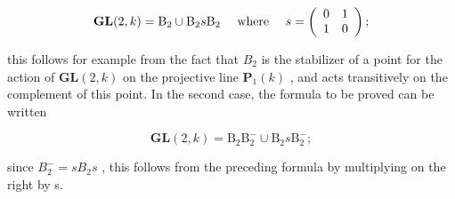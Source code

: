 \[
\mathbf {G L} (2, k) = \mathrm{B} _ {2} \cup \mathrm{B} _ {2} s \mathrm{B} _ {2} \quad \text { where } \quad s = \left( \begin{array}{c c} 0 & 1 \\ 1 & 0 \end{array} \right);
\]

this follows for example from the fact that \(B_{2}\) is the stabilizer of a point for the action of \(\mathbf{GL}(2,k)\) on the projective line \(\mathbf{P}_{1}(k)\) , and acts transitively on the complement of this point. In the second case, the formula to be proved can be written

\[
\mathbf {G L} (2, k) = \mathrm{B} _ {2} \mathrm{B} _ {2} ^ {-} \cup \mathrm{B} _ {2} s \mathrm{B} _ {2} ^ {-};
\]

since \(B_{2}^{-} = sB_{2}s\) , this follows from the preceding formula by multiplying on the right by s.

